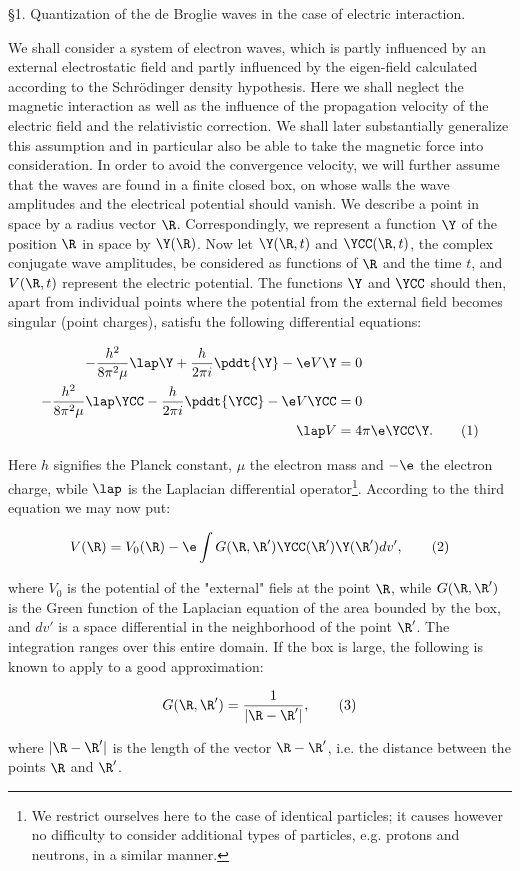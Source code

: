 \documentclass{article}
\newcommand{\nequ}[2]{
\begin{align*}
#1
\tag{#2}
\end{align*}
}
\begin{document}
§1. Quantization of the de Broglie waves in the case of electric interaction.

We shall consider a system of electron waves, which is partly influenced by an external electrostatic field and partly influenced by the eigen-field calculated according to the Schrödinger density hypothesis. Here we shall neglect the magnetic interaction as well as the influence of the propagation velocity of the electric field and the relativistic correction. We shall later substantially generalize this assumption and in particular also be able to take the magnetic force into consideration. In order to avoid the convergence velocity, we will further assume that the waves are found in a finite closed box, on whose walls the wave amplitudes and the electrical potential should vanish. We describe a point in space by a radius vector $\R$. Correspondingly, we represent a function $\Y$ of the position $\R$ in space by $\Y(\R)$. Now let $\Y(\R,t)$ and $\YCC(\R,t)$, the complex conjugate wave amplitudes, be considered as functions of $\R$ and the time $t$, and $V(\R,t)$ represent the electric potential. The functions $\Y$ and $\YCC$ should then, apart from individual points where the potential from the external field becomes singular (point charges), satisfu the following differential equations:

\nequ{
-\frac{h^2}{8\pi^2\mu}\lap\Y + \frac{h}{2\pi i}\pddt{\Y} - \e V\Y &= 0\\
-\frac{h^2}{8\pi^2\mu}\lap\YCC - \frac{h}{2\pi i}\pddt{\YCC} - \e V\YCC &= 0\\
 \lap V &= 4\pi\e\YCC\Y.
}{1}

Here $h$ signifies the Planck constant, $\mu$ the electron mass and $-\e$ the electron charge, wbile $\lap$ is the Laplacian differential operator\footnote{We restrict ourselves here to the case of identical particles; it causes however no difficulty to consider additional types of particles, e.g. protons and neutrons, in a similar manner.}. According to the third equation we may now put:
\nequ{
V(\R) = V_0(\R) - \e\int G(\R, \R^\prime)\YCC(\R^\prime)\Y(\R^\prime)dv',
}{2}

where $V_0$ is the potential of the "external" fiels at the point $\R$, while $G(\R,\R')$ is the Green function of the Laplacian equation of the area bounded by the box, and $dv'$ is a space differential in the neighborhood of the point $\R'$. The integration ranges over this entire domain. If the box is large, the following is known to apply to a good approximation:
\nequ{
G(\R,\R') = \frac{1}{|\R-\R'|},
}{3}
where $|\R-\R'|$ is the length of the vector $\R-\R'$, i.e. the distance between the points $\R$ and $\R'$.
\end{document}
